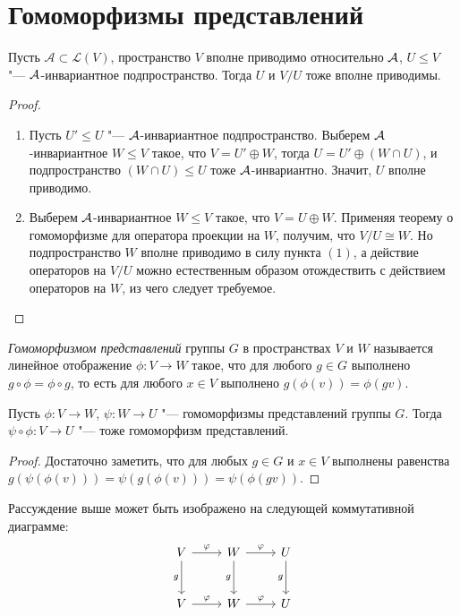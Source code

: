 \section{Гомоморфизмы представлений}

\begin{theorem}
	Пусть $\mathcal A \subset \mathcal{L}(V)$, пространство $V$ вполне приводимо относительно $\mathcal A$, $U \le V$ "--- $\mathcal A$-инвариантное подпространство. Тогда $U$ и $V / U$ тоже вполне приводимы.
\end{theorem}

\begin{proof}~
	\begin{enumerate}
		\item Пусть $U' \le U$ "--- $\mathcal A$-инвариантное подпространство. Выберем $\mathcal A$-инвариантное $W \le V$ такое, что $V = U' \oplus W$, тогда $U = U' \oplus (W \cap U)$, и подпространство $(W \cap U) \le U$ тоже $\mathcal A$-инвариантно. Значит, $U$ вполне приводимо.
		\item Выберем $\mathcal A$-инвариантное $W \le V$ такое, что $V = U \oplus W$. Применяя теорему о гомоморфизме для оператора проекции на $W$, получим, что $V / U \cong W$. Но подпространство $W$ вполне приводимо в силу пункта $(1)$, а действие операторов на $V / U$ можно естественным образом отождествить с действием операторов на $W$, из чего следует требуемое.\qedhere
	\end{enumerate}
\end{proof}

\begin{definition}
	\textit{Гомоморфизмом представлений} группы $G$ в пространствах $V$ и $W$ называется линейное отображение $\phi : V \to W$ такое, что для любого $g \in G$ выполнено $g\circ\phi = \phi\circ g$, то есть для любого $x \in V$ выполнено $g(\phi(v)) = \phi(gv)$.
\end{definition}

\begin{proposition}
	Пусть $\phi : V \to W$, $\psi : W \to U$ "--- гомоморфизмы представлений группы $G$. Тогда $\psi\circ\phi: V \to U$ "--- тоже гомоморфизм представлений.
\end{proposition}

\begin{proof}
	Достаточно заметить, что для любых $g \in G$ и $x \in V$ выполнены равенства $g(\psi(\phi(v))) = \psi(g(\phi(v))) = \psi(\phi(gv))$.
\end{proof}

\begin{note}
	Рассуждение выше может быть изображено на следующей коммутативной диаграмме:
	\[
	\begin{tikzcd}[row sep = large]
		V \arrow{r}{\phi} \arrow[swap]{d}{g} & W \arrow{r}{\phi} \arrow[swap]{d}{g} & U \arrow[swap]{d}{g}\\
		V \arrow{r}{\phi} & W \arrow{r}{\phi} & U
	\end{tikzcd}
	\]
\end{note}

